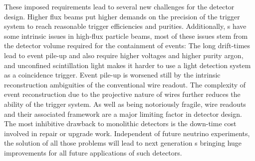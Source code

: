 These imposed requirements lead to several new challenges for the detector design.
Higher flux beams put higher demands on the precision of the trigger system to reach reasonable trigger efficiencies and purities.
Additionally, \lartpc{}s have some intrinsic issues in high-flux particle beams, most of these issues stem from the detector volume required for the containment of events:
The long drift-times lead to event pile-up and also require higher voltages and higher purity argon, and unconfined scintillation light makes it harder to use a light detection system as a coincidence trigger.
Event pile-up is worsened still by the intrinsic reconstruction ambiguities of the conventional wire readout.
The complexity of event reconstruction due to the projective nature of wires further reduces the ability of the trigger system.
As well as being notoriously fragile, wire readouts and their associated framework are a major limiting factor in detector design.
The most inhibitive drawback to monolithic detectors is the down-time cost involved in repair or upgrade work.
Independent of future neutrino experiments, the solution of all those problems will lead to next generation \lartpc{}s bringing huge improvements for all future applications of such detectors.